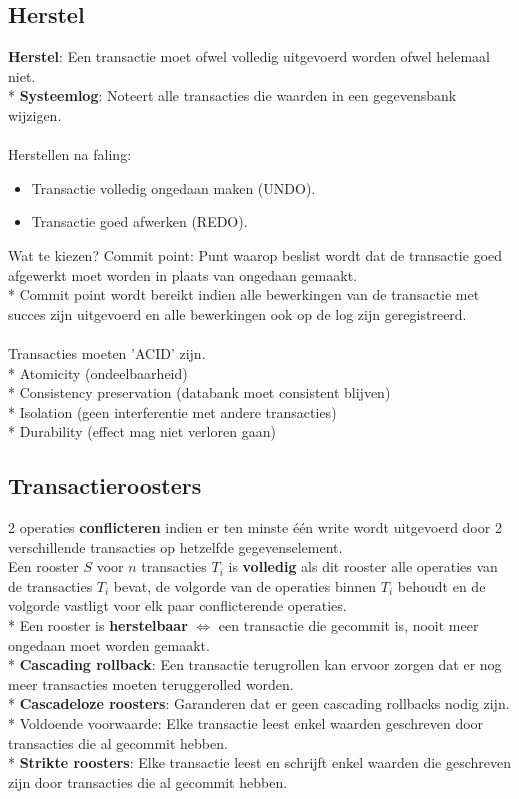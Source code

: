 \documentclass[10pt]{article}
\begin{document}
\subsection{Herstel}
\textbf{Herstel}: Een transactie moet ofwel volledig uitgevoerd worden ofwel helemaal niet.\\*
\textbf{Systeemlog}: Noteert alle transacties die waarden in een gegevensbank wijzigen.\\\\
Herstellen na faling:
\begin{itemize}
\item Transactie volledig ongedaan maken (UNDO).
\item Transactie goed afwerken (REDO).
\end{itemize}
Wat te kiezen? Commit point: Punt waarop beslist wordt dat de transactie goed afgewerkt moet worden in plaats van ongedaan gemaakt.\\*
Commit point wordt bereikt indien alle bewerkingen van de transactie met succes zijn uitgevoerd en alle bewerkingen ook op de log zijn geregistreerd.\\\\
Transacties moeten 'ACID' zijn.\\*
Atomicity (ondeelbaarheid)\\*
Consistency preservation (databank moet consistent blijven)\\*
Isolation (geen interferentie met andere transacties)\\*
Durability (effect mag niet verloren gaan)
\subsection{Transactieroosters}
2 operaties \textbf{conflicteren} indien er ten minste \'e\'en write wordt uitgevoerd door 2 verschillende transacties op hetzelfde gegevenselement.\\
Een rooster $S$ voor $n$ transacties $T_i$ is \textbf{volledig} als dit rooster alle operaties van de transacties $T_i$ bevat, de volgorde van de operaties binnen $T_i$ behoudt en de volgorde vastligt voor elk paar conflicterende operaties.\\*
Een rooster is \textbf{herstelbaar} $\Leftrightarrow$ een transactie die gecommit is, nooit meer ongedaan moet worden gemaakt.\\*
\textbf{Cascading rollback}: Een transactie terugrollen kan ervoor zorgen dat er nog meer transacties moeten teruggerolled worden.\\*
\textbf{Cascadeloze roosters}: Garanderen dat er geen cascading rollbacks nodig zijn.\\*
Voldoende voorwaarde: Elke transactie leest enkel waarden geschreven door transacties die al gecommit hebben.\\*
\textbf{Strikte roosters}: Elke transactie leest en schrijft enkel waarden die geschreven zijn door transacties die al gecommit hebben.
\end{document}
